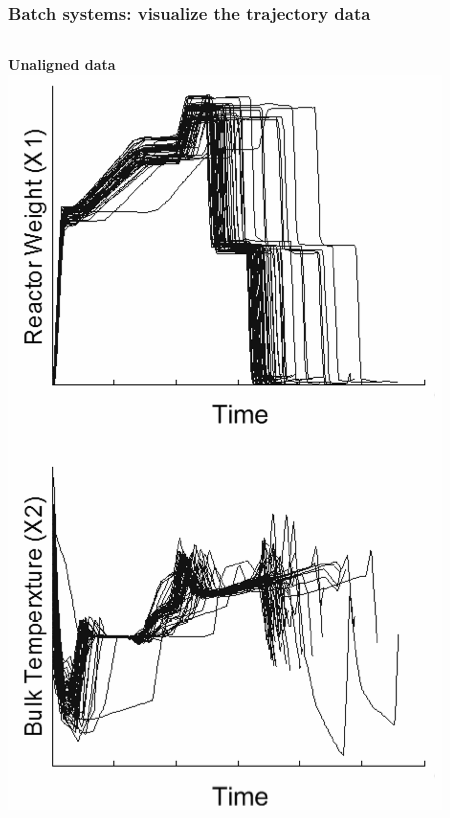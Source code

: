 \documentclass[handout, 12pt]{beamer}
\begin{document}
\begin{frame}\frametitle{Batch systems: visualize the trajectory data}
	
	\begin{columns}
			\alert{\textbf{Unaligned data} }
 			\vfill
			\includegraphics[height=0.8\textheight]{images/unaligned-trajectories-many-batches.png}
		

\end{columns}
\end{frame}
\end{document}
